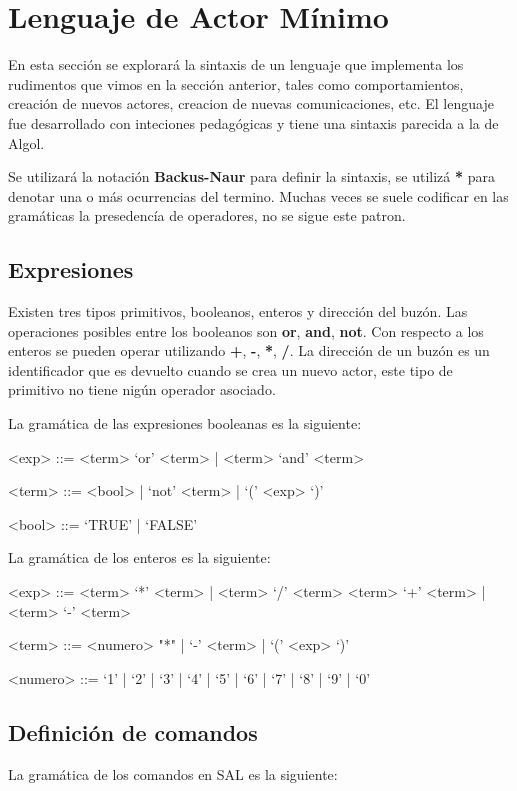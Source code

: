 \chapter{Lenguaje de Actor Mínimo}

En esta sección se explorará la sintaxis de un lenguaje que implementa los rudimentos que vimos en la sección anterior, tales como comportamientos, creación de nuevos actores, creacion de nuevas comunicaciones, etc. El lenguaje \SAL fue desarrollado con inteciones pedagógicas y tiene una sintaxis parecida a la de Algol. 

Se utilizará la notación \textbf{Backus-Naur} para definir la sintaxis, se utilizá \textbf{*} para denotar una o más ocurrencias del termino. Muchas veces se suele codificar en las gramáticas la presedencía de operadores, no se sigue este patron.

\section{Expresiones}
Existen tres tipos primitivos, booleanos, enteros y dirección del buzón. Las operaciones
posibles entre los booleanos son \textbf{or}, \textbf{and}, \textbf{not}. Con
respecto a los enteros se pueden operar utilizando \textbf{+}, \textbf{-},
\textbf{*}, \textbf{/}.
La dirección de un buzón es un identificador que es devuelto cuando se crea un nuevo actor, 
este tipo de primitivo no tiene nigún operador asociado.

La gramática de las expresiones booleanas es la siguiente:

\begin{grammar}
<exp> ::= <term> `or' <term> | <term> `and' <term> 
  
<term> ::= <bool> | `not' <term> | `(' <exp> `)' 

<bool> ::= `TRUE' | `FALSE'
\end{grammar}

La gramática de los enteros es la siguiente:

\begin{grammar}
<exp> ::= <term> `*' <term> | <term> `/' <term>  
  \alt <term> `+' <term>  | <term> `-' <term>

<term> ::= <numero> "*" | `-' <term> | `(' <exp> `)'

<numero> ::= `1' | `2' | `3' | `4' | `5' | `6' | `7' | `8' | `9' | `0'
\end{grammar}


\section{Definición de comandos}
La gramática de los comandos en SAL es la siguiente:


